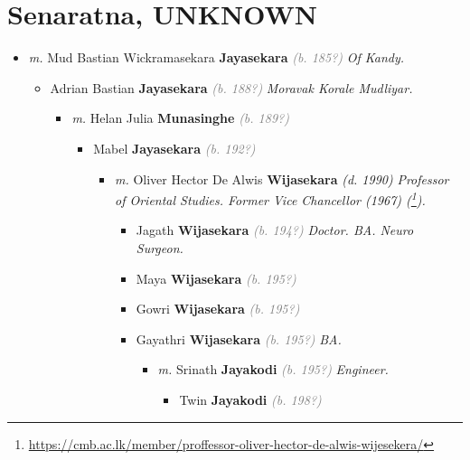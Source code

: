 \documentclass[10pt, openany]{book}
\begin{document}
\chapter{Senaratna, UNKNOWN}
\label{00000703}
\textcolor{slmaroon}{\textit{}}
\begin{itemize}
\item{\textit{m.} Mud Bastian Wickramasekara \textbf{Jayasekara} \textcolor{gray}{\textit{(b. 185?)}} \textcolor{slmaroon}{\textit{Of Kandy.}}   \label{couple:00000307:00000703} \begin{itemize}
\item{Adrian Bastian \textbf{Jayasekara} \textcolor{gray}{\textit{(b. 188?)}} \textcolor{slmaroon}{\textit{Moravak Korale Mudliyar.}}
\begin{itemize}
\item{\textit{m.} Helan Julia \textbf{Munasinghe} \textcolor{gray}{\textit{(b. 189?)}}   \label{couple:00000271:00000546} \begin{itemize}
\item{Mabel \textbf{Jayasekara} \textcolor{gray}{\textit{(b. 192?)}}
\begin{itemize}
\item{\textit{m.} Oliver Hector De Alwis \textbf{Wijasekara} \textcolor{slorange}{\textit{(d. 1990)}} \textcolor{slmaroon}{\textit{Professor of Oriental Studies. Former Vice Chancellor (1967) (\footnote{\url{https://cmb.ac.lk/member/proffessor-oliver-hector-de-alwis-wijesekera/}}).}}   \label{couple:00000301:00000983} \begin{itemize}
\item{Jagath \textbf{Wijasekara} \textcolor{gray}{\textit{(b. 194?)}} \textcolor{slmaroon}{\textit{Doctor.
BA.
Neuro Surgeon.}}
 }
\item{Maya \textbf{Wijasekara} \textcolor{gray}{\textit{(b. 195?)}}
 }
\item{Gowri \textbf{Wijasekara} \textcolor{gray}{\textit{(b. 195?)}}
 }
\item{Gayathri \textbf{Wijasekara} \textcolor{gray}{\textit{(b. 195?)}} \textcolor{slmaroon}{\textit{BA.}}
\begin{itemize}
\item{\textit{m.} Srinath \textbf{Jayakodi} \textcolor{gray}{\textit{(b. 195?)}} \textcolor{slmaroon}{\textit{Engineer.}}   \label{couple:00000263:00000986} \begin{itemize}
\item{Twin \textbf{Jayakodi} \textcolor{gray}{\textit{(b. 198?)}}
}
\end{itemize}}
\end{itemize}}
\end{itemize}}
\end{itemize}}
\end{itemize}}
\end{itemize}}
\end{itemize}}
\end{itemize}
\end{document}
